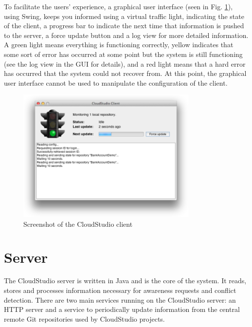 To facilitate the users' experience, a graphical user interface (seen in Fig. \ref{fig:gui}), using Swing, keeps you informed using a virtual traffic light, indicating the state of the client, a progress bar to indicate the next time that information is pushed to the server, a force update button and a log view for more detailed information. A green light means everything is functioning correctly, yellow indicates that some sort of error has occurred at some point but the system is still functioning (see the log view in the GUI for details), and a red light means that a hard error has occurred that the system could not recover from. At this point, the graphical user interface cannot be used to manipulate the configuration of the client. \\

\begin{figure}[h!]
  \centering
      \includegraphics[width=0.8\textwidth]{gui}
  \caption{Screenshot of the CloudStudio client}
  \label{fig:gui}
\end{figure}








\section{Server}

The CloudStudio server is written in Java and is the core of the system. It reads, stores and processes information necessary for awareness requests and conflict detection. There are two main services running on the CloudStudio server: an HTTP server and a service to periodically update information from the central remote Git repositories used by CloudStudio projects. \\

